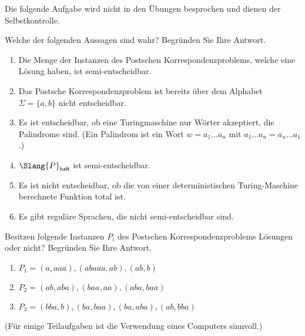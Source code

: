 \documentclass[german]{latteachCD}[2017/03/28]
\begin{document}
\maketitle

\begin{mdframed}
  Die folgende Aufgabe wird nicht in den Übungen besprochen und dienen der
  Selbstkontrolle.

  \renewcommand{\theexercise}{\Alph{exercise}}
  \setcounter{exercise}{6}

  \begin{exercise}
    Welche der folgenden Aussagen sind wahr? Begründen Sie Ihre Antwort.
    \begin{enumerate}
    \item Die Menge der Instanzen des Postschen Korrespondenzproblems, welche
      eine Lösung haben, ist semi-entscheidbar.
    \item Das Postsche Korrespondenzproblem ist bereits über dem Alphabet
      $\Sigma = \{a, b\}$ nicht entscheidbar.
    \item Es ist entscheidbar, ob eine Turingmaschine nur Wörter akzeptiert, die
      Palindrome sind. (Ein Palindrom ist ein Wort $w = a_{1} \dots a_{n}$ mit
      $a_{1} \dots a_{n} = a_{n} \dots a_{1}$.)
    \item $\Slang{P}_{\mathsf{halt}}$ ist semi-entscheidbar.
    \item Es ist nicht entscheidbar, ob die von einer deterministischen
      Turing-Maschine berechnete Funktion total ist.
    \item Es gibt reguläre Sprachen, die nicht semi-entscheidbar sind.
    \end{enumerate}

    \vspace*{-0.5\baselineskip}
  \end{exercise}
\end{mdframed}

\vspace*{0.5\baselineskip}

\setcounter{exercise}{0}

\begin{exercise}
  Besitzen folgende Instanzen $P_{i}$ des Postschen Korrespondenzproblems Lösungen oder
  nicht?  Begründen Sie Ihre Antwort.
  \begin{enumerate}
  \item $P_{1} = (a, aaa), (abaaa, ab), (ab, b)$
  \item $P_{2} = (ab, aba), (baa, aa), (aba, baa)$
  \item $P_{3} = (bba, b), (ba, baa), (ba, aba), (ab, bba)$
  \end{enumerate}
  (Für einige Teilaufgaben ist die Verwendung eines Computers sinnvoll.)
\end{exercise}
\end{document}

